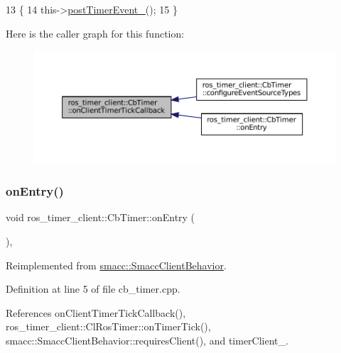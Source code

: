 \begin{DoxyCode}
13 \{
14     this->\hyperlink{classros__timer__client_1_1CbTimer_a7e15bf1451d17c96aba814dc3e5c08e9}{postTimerEvent\_}();
15 \}
\end{DoxyCode}
Here is the caller graph for this function\+:
\nopagebreak
\begin{figure}[H]
\begin{center}
\leavevmode
\includegraphics[width=350pt]{classros__timer__client_1_1CbTimer_ad75f8dfb3baa32e3ba7d373e8d902b47_icgraph}
\end{center}
\end{figure}
\mbox{\label{classros__timer__client_1_1CbTimer_a25c086b5988642602938d92f9555ce18}} 
\subsubsection{\texorpdfstring{on\+Entry()}{onEntry()}}
{\footnotesize\ttfamily void ros\+\_\+timer\+\_\+client\+::\+Cb\+Timer\+::on\+Entry (\begin{DoxyParamCaption}{ }\end{DoxyParamCaption})\hspace{0.3cm}{\ttfamily [override]}, {\ttfamily [virtual]}}



Reimplemented from \hyperlink{classsmacc_1_1SmaccClientBehavior_a7962382f93987c720ad432fef55b123f}{smacc\+::\+Smacc\+Client\+Behavior}.



Definition at line 5 of file cb\+\_\+timer.\+cpp.



References on\+Client\+Timer\+Tick\+Callback(), ros\+\_\+timer\+\_\+client\+::\+Cl\+Ros\+Timer\+::on\+Timer\+Tick(), smacc\+::\+Smacc\+Client\+Behavior\+::requires\+Client(), and timer\+Client\+\_\+.


